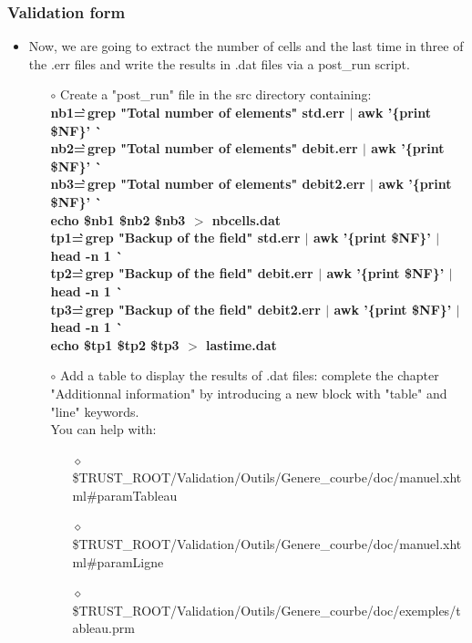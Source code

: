 \documentclass[10pt]{beamer}
\begin{document}
\begin{frame}
\frametitle{Validation form}
\begin{block}{}

\begin{itemize}
\item Now, we are going to extract the number of cells and the last time in three of the .err files and write the results in .dat files via a post\_run script.

    \begin{itemize}
    \item [$\circ$] Create a "post\_run" file in the src directory containing:\\
    {\footnotesize{
    \textbf{nb1=\` \,grep "Total number of elements" std.err $|$ awk '\{print \$NF\}' \`} \\
    \textbf{nb2=\` \,grep "Total number of elements" debit.err $|$ awk '\{print \$NF\}' \`} \\
    \textbf{nb3=\` \,grep "Total number of elements" debit2.err $|$ awk '\{print \$NF\}' \`} \\
    \textbf{echo \$nb1 \$nb2 \$nb3 $>$ nbcells.dat} \\
    \textbf{tp1=\` \,grep "Backup of the field" std.err $|$ awk '\{print \$NF\}' $|$ head -n 1 \`} \\
    \textbf{tp2=\` \,grep "Backup of the field" debit.err $|$ awk '\{print \$NF\}' $|$ head -n 1 \`} \\
    \textbf{tp3=\` \,grep "Backup of the field" debit2.err $|$ awk '\{print \$NF\}' $|$ head -n 1 \`} \\
    \textbf{echo \$tp1 \$tp2 \$tp3 $>$ lastime.dat} \\
    }}

    \item [$\circ$] Add a table to display the results of .dat files: complete the chapter "Additionnal information" by introducing a new block with "table" and "line" keywords.\\
    You can help with:
        \begin{itemize}
        \item [$\diamond$] {\scriptsize{\$TRUST\_ROOT/Validation/Outils/Genere\_courbe/doc/manuel.xhtml\#paramTableau}}
        \item [$\diamond$] {\scriptsize{\$TRUST\_ROOT/Validation/Outils/Genere\_courbe/doc/manuel.xhtml\#paramLigne}}
        \item [$\diamond$] {\scriptsize{\$TRUST\_ROOT/Validation/Outils/Genere\_courbe/doc/exemples/tableau.prm}}
        \end{itemize}
    \end{itemize}
\end{itemize}

\end{block}
\end{frame}
\end{document}
